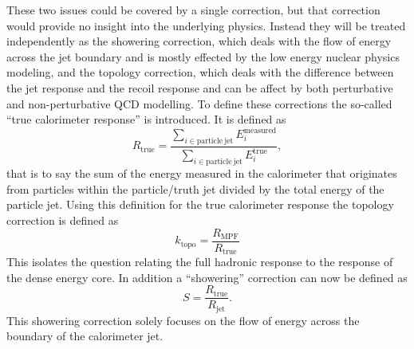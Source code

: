 These two issues could be covered by a single correction, but that correction would provide no insight into the underlying physics.  
Instead they will be treated independently as the showering correction, which deals with the flow of energy across the jet boundary and is mostly effected by the low energy nuclear physics modeling, and the topology correction, which deals with the difference between the jet response and the recoil response and can be affect by both perturbative and non-perturbative QCD modelling.  
To define these corrections the so-called ``true calorimeter response'' is introduced.  
It is defined as 
\begin{equation}
  R_{\mathrm{true}} = \frac{\sum_{i\in{\mathrm{particle~jet}}} E_i^{\mathrm{measured}}}{\sum_{i\in{\mathrm{particle~jet}}}E_i^{\mathrm{true}}}, 
\end{equation}
\noindent
that is to say the sum of the energy measured in the calorimeter that originates from particles within the particle/truth jet divided by the total energy of the particle jet.  
Using this definition for the true calorimeter response the topology correction is defined as
\begin{equation}
  k_{\mathrm{topo}} = \frac{R_{\mathrm{MPF}}}{R_{\mathrm{true}}}
\end{equation}
\noindent
This isolates the question relating the full hadronic response to the response of the dense energy core.
In addition a ``showering'' correction can now be defined as 
\begin{equation}
  S = \frac{R_{\mathrm{true}}}{R_{\mathrm{jet}}}.  
\end{equation}
\noindent
This showering correction solely focuses on the flow of energy across the boundary of the calorimeter jet.


